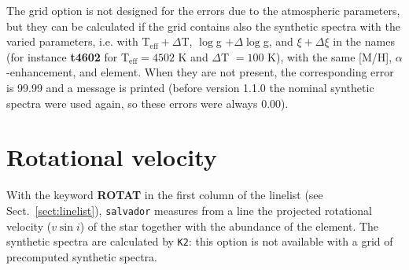 \documentclass[modern]{aastex701}
\begin{document}
The grid option is not designed for the errors due to the atmospheric parameters, but they can be calculated if the grid contains also the synthetic spectra with the varied parameters, i.e. with T$_{\mathrm{eff}} + \Delta$T, $\log$g $+ \Delta\log$g, and $\xi + \Delta\xi$ in the names (for instance {\bf t4602} for T$_{\mathrm{eff}} = 4502$ K and $\Delta$T $= 100$ K), with the same [M/H], $\alpha$-enhancement, and element. When they are not present, the corresponding error is 99.99 and a message is printed (before version 1.1.0 the nominal synthetic spectra were used again, so these errors were always 0.00).


\section{Rotational velocity} \label{sect:rotation}
\hrulefill

With the keyword {\bf ROTAT} in the first column of the linelist (see Sect.~\ref{sect:linelist}), \texttt{salvador} measures from a line the projected rotational velocity ($v \sin i$) of the star together with the abundance of the element. The synthetic spectra are calculated by \texttt{K2}: this option is not available with a grid of precomputed synthetic spectra.
\end{document}
